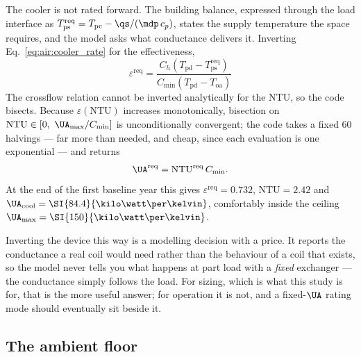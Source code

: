 The cooler is not rated forward. The building balance, expressed through the
load interface as $T_{\mathrm{ps}}^{\mathrm{req}} = T_{\mathrm{pc}} -
\qs/(\mdp\,c_{p})$, states the supply temperature the space requires, and the
model asks what conductance delivers it. Inverting
Eq.~\eqref{eq:air:cooler_rate} for the effectiveness,
\begin{equation}
\boxed{\;
\varepsilon^{\mathrm{req}} =
\frac{C_h\left(T_{\mathrm{pd}}-T_{\mathrm{ps}}^{\mathrm{req}}\right)}
     {C_{\min}\left(T_{\mathrm{pd}}-T_{\mathrm{oa}}\right)}
\;}
\label{eq:air:eps_req}
\end{equation}
The crossflow relation cannot be inverted analytically for the NTU, so the code
bisects. Because $\varepsilon(\mathrm{NTU})$ increases monotonically, bisection
on $\mathrm{NTU}\in[0,\ \UA_{\max}/C_{\min}]$ is unconditionally convergent;
the code takes a fixed \num{60} halvings --- far more than needed, and cheap,
since each evaluation is one exponential --- and returns
\begin{equation}
\UA^{\mathrm{req}} = \mathrm{NTU}^{\mathrm{req}}\,C_{\min} .
\label{eq:air:UAreq}
\end{equation}
At the end of the first baseline year this gives
$\varepsilon^{\mathrm{req}}=\num{0.732}$, $\mathrm{NTU}=\num{2.42}$ and
$\UA_{\mathrm{cool}}=\SI{84.4}{\kilo\watt\per\kelvin}$, comfortably inside the
ceiling $\UA_{\max}=\SI{150}{\kilo\watt\per\kelvin}$.

Inverting the device this way is a modelling decision with a price. It reports
the conductance a real coil would need rather than the behaviour of a coil that
exists, so the model never tells you what happens at part load with a
\emph{fixed} exchanger --- the conductance simply follows the load. For sizing,
which is what this study is for, that is the more useful answer; for operation
it is not, and a fixed-$\UA$ rating mode should eventually sit beside it.

\subsection{The ambient floor}
\label{sec:air:floor}

